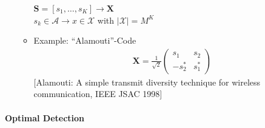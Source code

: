 \documentclass[a4paper, 10pt]{article}
\begin{document}
\begin{itemize}
\begin{itemize}
			$\mathbf{S}=[s_1,\dots ,s_K] \rightarrow \mathbf{X}$\\
			$s_k\in \mathcal{A} \rightarrow x\in\mathcal{X}$ with $|\mathcal{X}|=M^K$
			\item Example: ``Alamouti''-Code\\
			\begin{align*}
				\mathbf{X}=\frac{1}{\sqrt{2}}
				\begin{pmatrix}
					s_1 & s_2 \\
					-s_2^* & s_1^*
				\end{pmatrix}
			\end{align*}
			{\small[Alamouti: A simple transmit diversity technique for wireless communication, IEEE JSAC 1998]}
		\end{itemize}
\end{itemize}
\paragraph{Optimal Detection}
\end{document}
